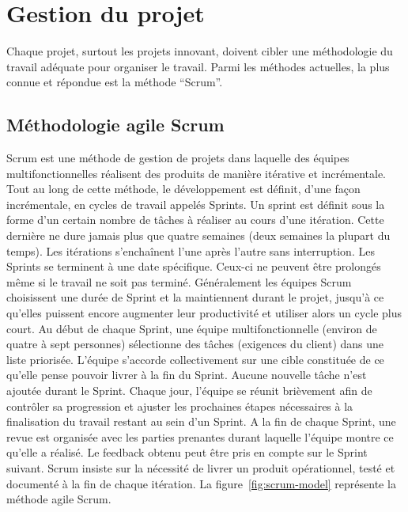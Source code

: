 \section{Gestion du projet }

Chaque projet, surtout les projets innovant, doivent cibler une méthodologie
du travail adéquate pour organiser le travail. Parmi les méthodes actuelles, la
plus connue et répondue est la méthode ``Scrum''.

\subsection{Méthodologie agile Scrum}

Scrum est une méthode de gestion de projets dans laquelle des équipes
multifonctionnelles réalisent des produits de manière itérative et
incrémentale. Tout au long de cette méthode, le développement est définit,
d'une façon incrémentale, en cycles de travail appelés Sprints. Un sprint est
définit sous la forme d'un certain nombre de tâches à réaliser au cours d'une
itération. Cette dernière ne dure jamais plus que quatre semaines (deux
semaines la plupart du temps). Les itérations s'enchaînent l'une après l'autre
sans interruption. Les Sprints se terminent à une date spécifique. Ceux-ci ne
peuvent être prolongés même si le travail ne soit pas terminé. Généralement les
équipes Scrum choisissent une durée de Sprint et la maintiennent durant le
projet, jusqu'à ce qu'elles puissent encore augmenter leur productivité et
utiliser alors un cycle plus court. Au début de chaque Sprint, une équipe
multifonctionnelle (environ de quatre à sept personnes) sélectionne des tâches
(exigences du client) dans une liste priorisée. L'équipe s'accorde
collectivement sur une cible constituée de ce qu'elle pense pouvoir livrer à la
fin du Sprint. Aucune nouvelle tâche n'est ajoutée durant le Sprint. Chaque
jour, l'équipe se réunit brièvement afin de contrôler sa progression et ajuster
les prochaines étapes nécessaires à la finalisation du travail restant au sein
d'un Sprint. A la fin de chaque Sprint, une revue est organisée avec les
parties prenantes durant laquelle l'équipe montre ce qu'elle a réalisé. Le
feedback obtenu peut être pris en compte sur le Sprint suivant. Scrum insiste
sur la nécessité de livrer un produit opérationnel, testé et documenté à la fin
de chaque itération. La figure~\ref{fig:scrum-model} représente la méthode
agile Scrum.



